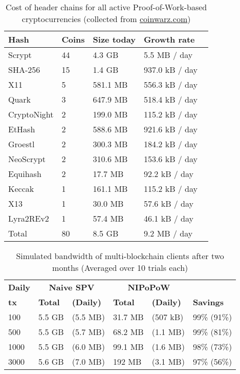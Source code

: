 \begin{table}
  \caption{Cost of header chains for all active Proof-of-Work-based cryptocurrencies (collected from \url{coinwarz.com})}
  \label{tbl.currencies}
  \small
  \centering
  \begin{tabular}{l|l|l|l}
    {\bf Hash} & {\bf Coins} & {\bf Size today} & {\bf Growth rate}  \\
    \hline
    Scrypt  & 44  & 4.3 GB  & 5.5 MB / day \  \\
    SHA-256  & 15  & 1.4 GB  & 937.0 kB / day \  \\
    X11  & 5  & 581.1 MB  & 556.3 kB / day \  \\
    Quark  & 3  & 647.9 MB  & 518.4 kB / day \  \\
    CryptoNight  & 2  & 199.0 MB  & 115.2 kB / day \  \\
    EtHash  & 2  & 588.6 MB  & 921.6 kB / day \  \\
    Groestl  & 2  & 300.3 MB  & 184.2 kB / day \  \\
    NeoScrypt  & 2  & 310.6 MB  & 153.6 kB / day \  \\
    Equihash  & 2  & 17.7 MB  & 92.2 kB / day \  \\
    Keccak  & 1  & 161.1 MB  & 115.2 kB / day \  \\
    X13  & 1  & 30.0 MB  & 57.6 kB / day \  \\
    Lyra2REv2  & 1  & 57.4 MB  & 46.1 kB / day \  \\
    \hline
    Total  & 80   &  8.5 GB  & 9.2 MB  / day  \\
  \end{tabular}
\end{table}



\begin{table}
  \caption{Simulated bandwidth of multi-blockchain clients after two months (Averaged over 10 trials each)}
  \label{tbl.experiment}
  \small
  \centering
  \begin{tabular}
    {
      l@{\hspace{1pt}}|
      l@{\hspace{1pt}}l@{\hspace{1pt}}|
      l@{\hspace{1pt}}l@{\hspace{1pt}}|
      l@{\hspace{0.1pt}}}

      \multicolumn{1}{l|}{\bf Daily} & \multicolumn{2}{c|}{\bf Naive SPV} & \multicolumn{2}{c|}{\bf NIPoPoW} \\
      {\bf tx} & {\bf Total} & {\bf (Daily)} & {\bf Total} & {\bf (Daily)} & {\bf Savings} \\
    \hline
    100   &  5.5 GB & (5.5 MB)   & 31.7 MB & (507 kB)   & 99\% (91\%) \\
    500   &  5.5 GB & (5.7 MB)   & 68.2 MB & (1.1 MB)     & 99\% (81\%) \\
    1000  &  5.5 GB & (6.0 MB)   & 99.1 MB & (1.6 MB)     & 98\% (73\%) \\
    3000  &  5.6 GB & (7.0 MB)   & 192 MB& (3.1 MB)     & 97\% (56\%) \\
    \end{tabular}
  \end{table}


